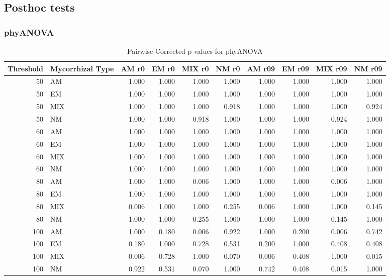 \documentclass[]{article}
\begin{document}
\hypertarget{posthoc-tests-3}{%
\subsection{Posthoc tests}\label{posthoc-tests-3}}

\hypertarget{phyanova-7}{%
\subsubsection{phyANOVA}\label{phyanova-7}}

\begin{table}[H]

\caption{\label{tab:unnamed-chunk-42}Pairwise Corrected p-values for phyANOVA}
\centering
\begin{tabular}{r|l|r|r|r|r|r|r|r|r}
\hline
Threshold & Mycorrhizal Type & AM r0 & EM r0 & MIX r0 & NM r0 & AM r09 & EM r09 & MIX r09 & NM r09\\
\hline
50 & AM & 1.000 & 1.000 & 1.000 & 1.000 & 1.000 & 1.000 & 1.000 & 1.000\\
\hline
50 & EM & 1.000 & 1.000 & 1.000 & 1.000 & 1.000 & 1.000 & 1.000 & 1.000\\
\hline
50 & MIX & 1.000 & 1.000 & 1.000 & 0.918 & 1.000 & 1.000 & 1.000 & 0.924\\
\hline
50 & NM & 1.000 & 1.000 & 0.918 & 1.000 & 1.000 & 1.000 & 0.924 & 1.000\\
\hline
60 & AM & 1.000 & 1.000 & 1.000 & 1.000 & 1.000 & 1.000 & 1.000 & 1.000\\
\hline
60 & EM & 1.000 & 1.000 & 1.000 & 1.000 & 1.000 & 1.000 & 1.000 & 1.000\\
\hline
60 & MIX & 1.000 & 1.000 & 1.000 & 1.000 & 1.000 & 1.000 & 1.000 & 1.000\\
\hline
60 & NM & 1.000 & 1.000 & 1.000 & 1.000 & 1.000 & 1.000 & 1.000 & 1.000\\
\hline
80 & AM & 1.000 & 1.000 & 0.006 & 1.000 & 1.000 & 1.000 & 0.006 & 1.000\\
\hline
80 & EM & 1.000 & 1.000 & 1.000 & 1.000 & 1.000 & 1.000 & 1.000 & 1.000\\
\hline
80 & MIX & 0.006 & 1.000 & 1.000 & 0.255 & 0.006 & 1.000 & 1.000 & 0.145\\
\hline
80 & NM & 1.000 & 1.000 & 0.255 & 1.000 & 1.000 & 1.000 & 0.145 & 1.000\\
\hline
100 & AM & 1.000 & 0.180 & 0.006 & 0.922 & 1.000 & 0.200 & 0.006 & 0.742\\
\hline
100 & EM & 0.180 & 1.000 & 0.728 & 0.531 & 0.200 & 1.000 & 0.408 & 0.408\\
\hline
100 & MIX & 0.006 & 0.728 & 1.000 & 0.070 & 0.006 & 0.408 & 1.000 & 0.015\\
\hline
100 & NM & 0.922 & 0.531 & 0.070 & 1.000 & 0.742 & 0.408 & 0.015 & 1.000\\
\hline
\end{tabular}
\end{table}
\end{document}
